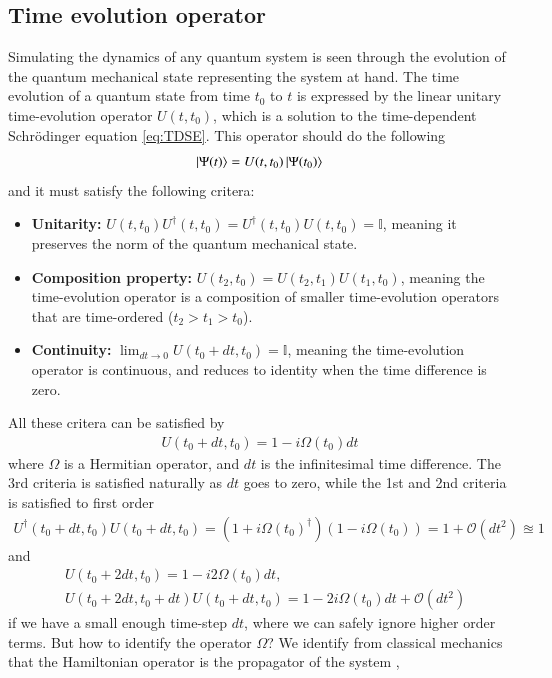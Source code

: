 \documentclass{subfiles}
\begin{document}
\subsection{Time evolution operator}
Simulating the dynamics of any quantum system is seen through the evolution of the quantum mechanical state representing the system at hand. The time evolution of a quantum state from time $t_0$ to $t$ is expressed by the linear unitary time-evolution operator $U(t, t_0)$, which is a solution to the time-dependent Schrödinger equation \eqref{eq:TDSE}\cite{sakurai1986modern, berera2021quantum}. This operator should do the following
\begin{equation}
    \ket{\Psi(t)} = U(t, t_0)\ket{\Psi(t_0)}
\end{equation}
and it must satisfy the following critera:
\begin{itemize}
    \item \textbf{Unitarity:} $U(t, t_0)U^\dagger(t, t_0) = U^\dagger(t, t_0)U(t, t_0) = \mathbb{I}$, meaning it preserves the norm of the quantum mechanical state.
    \item \textbf{Composition property:} $U(t_2, t_0) = U(t_2, t_1)U(t_1, t_0)$, meaning the time-evolution operator is a composition of smaller time-evolution operators that are time-ordered ($t_2>t_1>t_0$).
    \item \textbf{Continuity:} $\lim_{dt\to 0}U(t_0 + dt, t_0) = \mathbb{I}$, meaning the time-evolution operator is continuous, and reduces to identity when the time difference is zero.
\end{itemize}
All these critera can be satisfied by 
\begin{align*}
    U(t_0 + dt, t_0) = 1 - i\Omega(t_0) dt
\end{align*}
where $\Omega$ is a Hermitian operator, and $dt$ is the infinitesimal time difference. The 3rd criteria is satisfied naturally as $dt$ goes to zero, while the 1st and 2nd criteria is satisfied to first order 
\begin{align*}
    U^\dagger(t_0 + dt, t_0)U(t_0 + dt, t_0) = (1 + i\Omega(t_0)^\dagger)(1 - i\Omega(t_0)) = 1 + \mathcal{O}(dt^2) \approxeq 1
\end{align*}
and
\begin{align*}
    &U(t_0 + 2dt, t_0) = 1 - i2\Omega(t_0)dt, \\
    &U(t_0 + 2dt, t_0 +dt)U(t_0 + dt, t_0) = 1 - 2i\Omega(t_0)dt + \mathcal{O}(dt^2)
\end{align*}
if we have a small enough time-step $dt$, where we can safely ignore higher order terms. But how to identify the operator $\Omega$? We identify from classical mechanics that the Hamiltonian operator is the propagator of the system \cite{sakurai1986modern}, 
\end{document}

